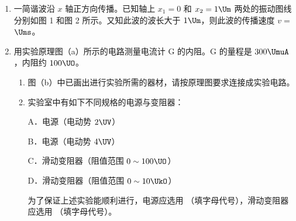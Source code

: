 \documentclass[\gkver]{gaokaozhenti}
\begin{document}
\begin{enumerate}
{$f_{\text{乙}}'L + 300\UN \times \frac{1}{2}L = 100\Ukg \times 10\UN/\Ukg \times \frac{1}{3}L$，

解得 $f_{\text{乙}}' = \frac{550}{3}\UN$，

故 $\Delta f_{\text{甲}} = f_{\text{甲}} - f_{\text{甲}}' = 150\UN$，$\Delta f_{\text{乙}} = f_{\text{乙}} - f_{\text{乙}}' = 150\UN$。
}

\item
一简谐波沿 $x$ 轴正方向传播。已知轴上 $x_{1} = 0$ 和 $x_{2} = 1\Um$ 两处的振动图线分别如图 1 和图 2 所示。又知此波的波长大于 $1\Um$，则此波的传播速度 $v =$ $\Ums$。
\jdanswer{
$333\Ums$
}


\item
用实验原理图（a）所示的电路测量电流计 G 的内阻。G 的量程是 $300\UmuA$，内阻约 $100\UO$。
\begin{enumerate}
	\item
	图（b）中已画出进行实验所需的器材，请按原理图要求连接成实验电路。
	\item
	实验室中有如下不同规格的电源与变阻器：

	A．电源（电动势 $2\UV$）

	B．电源（电动势 $4\UV$）

	C．滑动变阻器（阻值范围 $0\sim100\UO$）

	D．滑动变阻器（阻值范围 $0\sim10\UkO$）

	为了保证上述实验能顺利进行，电源应选用 （填字母代号），滑动变阻器应选用 （填字母代号）。
\end{enumerate}
\end{enumerate}
\end{document}
